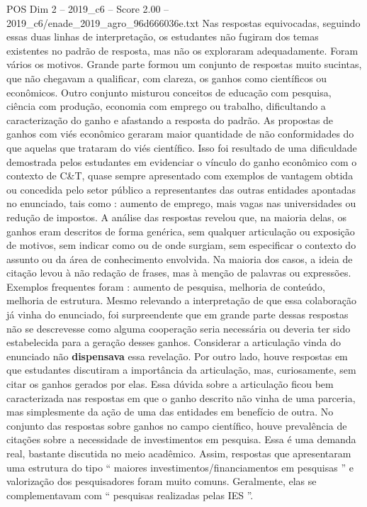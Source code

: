 \begin{textsample}{POS Dim 2 – 2019\_c6 – Score 2.00 – 2019\_c6/enade\_2019\_agro\_96d666036e.txt}
Nas respostas equivocadas, seguindo essas duas linhas de interpretação, os estudantes não fugiram dos temas existentes no padrão de resposta, mas não os exploraram adequadamente.
Foram vários os motivos.
Grande parte formou um conjunto de respostas muito sucintas, que não chegavam a qualificar, com clareza, os ganhos como científicos ou econômicos.
Outro conjunto misturou conceitos de educação com pesquisa, ciência com produção, economia com emprego ou trabalho, dificultando a caracterização do ganho e afastando a resposta do padrão.
As propostas de ganhos com viés econômico geraram maior quantidade de não conformidades do que aquelas que trataram do viés científico.
Isso foi resultado de uma dificuldade demostrada pelos estudantes em evidenciar o vínculo do ganho econômico com o contexto de C\&T, quase sempre apresentado com exemplos de vantagem obtida ou concedida pelo setor público a representantes das outras entidades apontadas no enunciado, tais como : aumento de emprego, mais vagas nas universidades ou redução de impostos.
A análise das respostas revelou que, na maioria delas, os ganhos eram descritos de forma genérica, sem qualquer articulação ou exposição de motivos, sem indicar como ou de onde surgiam, sem especificar o contexto do assunto ou da área de conhecimento envolvida.
Na maioria dos casos, a ideia de citação levou à não redação de frases, mas à menção de palavras ou expressões.
Exemplos frequentes foram : aumento de pesquisa, melhoria de conteúdo, melhoria de estrutura.
Mesmo relevando a interpretação de que essa colaboração já vinha do enunciado, foi surpreendente que em grande parte dessas respostas não se descrevesse como alguma cooperação seria necessária ou deveria ter sido estabelecida para a geração desses ganhos.
Considerar a articulação vinda do enunciado não \textbf{dispensava} essa revelação.
Por outro lado, houve respostas em que estudantes discutiram a importância da articulação, mas, curiosamente, sem citar os ganhos gerados por elas.
Essa dúvida sobre a articulação ficou bem caracterizada nas respostas em que o ganho descrito não vinha de uma parceria, mas simplesmente da ação de uma das entidades em benefício de outra.
No conjunto das respostas sobre ganhos no campo científico, houve prevalência de citações sobre a necessidade de investimentos em pesquisa.
Essa é uma demanda real, bastante discutida no meio acadêmico.
Assim, respostas que apresentaram uma estrutura do tipo “ maiores investimentos/financiamentos em pesquisas ” e valorização dos pesquisadores foram muito comuns.
Geralmente, elas se complementavam com “ pesquisas realizadas pelas IES ”.

\end{textsample}
